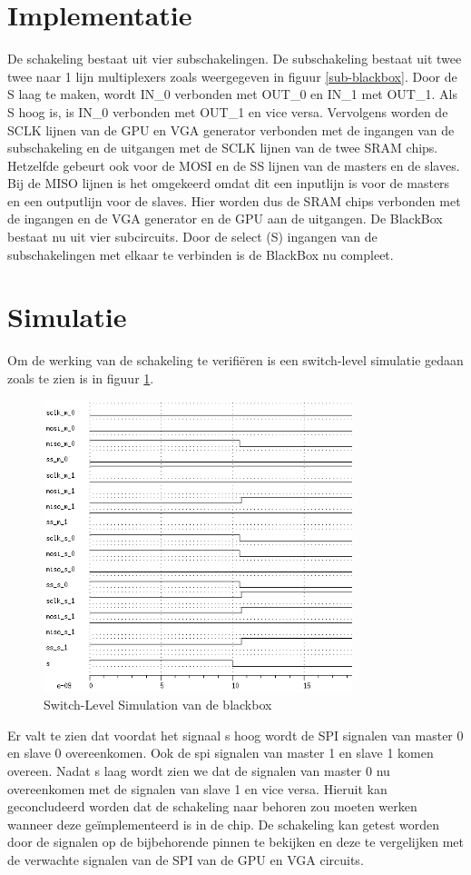 \documentclass[oneside,dutch]{tudelft-report}
\begin{document}
\section{Implementatie}
De schakeling bestaat uit vier subschakelingen. De subschakeling bestaat uit twee twee naar 1 lijn multiplexers zoals weergegeven in figuur \ref{sub-blackbox}. Door de S laag te maken, wordt IN\_0 verbonden met OUT\_0 en IN\_1 met OUT\_1. Als S hoog is, is IN\_0 verbonden met OUT\_1 en vice versa. Vervolgens worden de SCLK lijnen van de GPU en VGA generator verbonden met de ingangen van de subschakeling en de uitgangen met de SCLK lijnen van de twee SRAM chips. Hetzelfde gebeurt ook voor de MOSI en de SS lijnen van de masters en de slaves. Bij de MISO lijnen is het omgekeerd omdat dit een inputlijn is voor de masters en een outputlijn voor de slaves. Hier worden dus de SRAM chips verbonden met de ingangen en de VGA generator en de GPU aan de uitgangen. De BlackBox bestaat nu uit vier subcircuits. Door de select (S) ingangen van de subschakelingen met elkaar te verbinden is de BlackBox nu compleet.
\section{Simulatie}
Om de werking van de schakeling te verifiëren is een switch-level simulatie gedaan zoals te zien is in figuur \ref{bbsls}. 

\begin{figure}[H]
\center
\includegraphics[width=9cm]{./BlackBox_SLS}
\caption{Switch-Level Simulation van de blackbox}
\label{bbsls}
\end{figure}

Er valt te zien dat voordat het signaal s hoog wordt de SPI signalen van master 0 en slave 0 overeenkomen. Ook de spi signalen van master 1 en slave 1 komen overeen. Nadat s laag wordt zien we dat de signalen van master 0 nu overeenkomen met de signalen van slave 1 en vice versa. Hieruit kan geconcludeerd worden dat de schakeling naar behoren zou moeten werken wanneer deze geïmplementeerd is in de chip. De schakeling kan getest worden door de signalen op de bijbehorende pinnen te bekijken en deze te vergelijken met de verwachte signalen van de SPI van de GPU en VGA circuits. 
\end{document}
